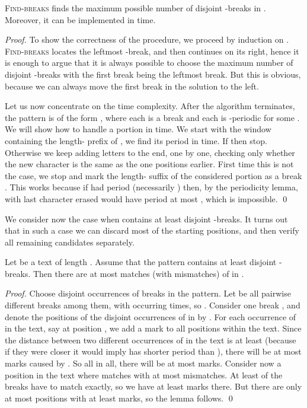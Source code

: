 \documentclass[runningheads]{llncs}
\newcommand{\proc}[1]{\textnormal{\scshape#1}}
\begin{document}
\begin{lemma}\label{lemma:finding_breaks}
\proc{Find-breaks} finds the maximum possible number of disjoint -breaks in . Moreover, it can be implemented in  time.
\end{lemma}
\begin{proof}
To show the correctness of the procedure, we proceed by induction on .  \proc{Find-breaks} locates the leftmost -break, and then continues on 
its right, hence it is enough to argue that it is always possible to choose the maximum number of disjoint -breaks with the first break being the
leftmost break. But this is obvious, because we can always move the first break in the solution to the left.

Let us now concentrate on the time complexity. After the algorithm terminates, the pattern is of the form , where each  is a break and each  is -periodic for some .  We will show how to handle a portion  in  time. We start with the window containing the length- prefix of , we find its period  in  time. If  then stop. Otherwise we keep adding letters to the end, one by one, checking only whether the new character is the same as the one  positions earlier. First time this is not the case, we stop and mark the length- suffix of the considered portion as a break . This works because if  had period  (necessarily ) then, by the periodicity lemma,  with last character erased would have period at most , which is impossible.
\qed
\end{proof}

We consider now the case when  contains at least  disjoint -breaks. It turns out that in such a case we can discard most of the starting positions, and then verify all remaining candidates separately.

\begin{lemma}\label{lemma:sparsify_matches}
Let  be a text of length . Assume that the pattern  contains at least  disjoint -breaks. Then there are at most  matches (with  mismatches) of  in .
\end{lemma}

\begin{proof}
Choose  disjoint occurrences of breaks in the pattern. Let  be all pairwise different breaks among them, with  occurring  times, so . Consider one break , and denote the positions of the disjoint occurrences of  in  by . For each occurrence of  in the text, say at position , we add a mark to all positions  within the text. Since the distance between two different occurrences of  in the text is at least  (because if they were closer it would imply  has shorter period than ), there will be at most  marks caused by . So all in all, there will be at most  marks. Consider now a position in the text where  matches with at most  mismatches. At least  of the  breaks have to match exactly, so we have at least  marks there. But there are only at most  positions with at least  marks, so the lemma follows.
\qed
\end{proof}
\end{document}
